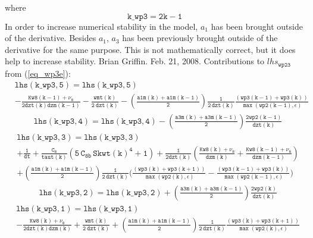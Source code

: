 \documentclass[11pt,fleqn]{article}
\begin{document}
%
where
%
\begin{equation}
\mathtt{ k\_wp3 = 2 k - 1}
\end{equation}
%
In order to increase numerical stability in the model, $a_{1}$ has been brought
outside of the derivative.  Besides $a_{1}$, $a_{3}$ has been previously brought
outside of the derivative for the same purpose.  This is not mathematically
correct, but it does help to increase stability.  Brian Griffin.  Feb. 21, 2008.
% 
Contributions to $lhs_{\mathtt{wp23}}$ from (\ref{eq_wp3e}):
%
\begin{equation}
\begin{split}
& \mathtt{ lhs(k\_wp3,5) = lhs(k\_wp3,5) }\\
& \mathtt{
- \frac{Kw8(k-1)+\nu_8}{2 dzt(k)dzm(k-1)}
- \frac{ wmt(k) }{ 2 \ dzt(k) }
- \left(\frac{a1m(k)+a1m(k-1)}{2}\right) \frac{1}{2 \, dzt(k)}
  \frac{ \left(wp3(k-1)+wp3(k)\right) }
       { \max\left( wp2(k-1), \epsilon \right) }
}
\end{split}
\end{equation}
%
\begin{equation}
\begin{split}
& \mathtt{ lhs(k\_wp3,4) = lhs(k\_wp3,4) 
  - \left(\frac{a3m(k)+a3m(k-1)}{2}\right) \frac{2 wp2(k-1)}{dzt(k)}
  }
\end{split}
\end{equation}
%
\begin{equation}
\begin{split}
& \mathtt{ lhs(k\_wp3,3) = lhs(k\_wp3,3) }\\
& \mathtt{
+ \frac{1}{dt}
+ \frac{C_8}{taut(k)}
   \left(  5 \, C_{8b} \, {Skwt(k)}^4 + 1 \right)
+ \frac{1}{2 dzt(k)} \left(  \frac{Kw8(k)+\nu_8}{dzm(k)}
                           + \frac{Kw8(k-1)+\nu_8}{dzm(k-1)} \right)
} \\
& \mathtt{
+ \left(\frac{a1m(k)+a1m(k-1)}{2}\right) \frac{1}{2 \, dzt(k)}
  \bigg(
    \frac{ \left(wp3(k)+wp3(k+1)\right) }
         { \max\left( wp2(k), \epsilon \right) }
  - \frac{ \left(wp3(k-1)+wp3(k)\right) }
         { \max\left( wp2(k-1), \epsilon \right) }
  \bigg)
}
\end{split}
\end{equation}
%
\begin{equation}
\begin{split}
& \mathtt{ lhs(k\_wp3,2) = lhs(k\_wp3,2)
  + \left(\frac{a3m(k)+a3m(k-1)}{2}\right) \frac{2 wp2(k)}{dzt(k)}
  }
\end{split}
\end{equation}
%
\begin{equation}
\begin{split}
& \mathtt{ lhs(k\_wp3,1) = lhs(k\_wp3,1) }\\
& \mathtt{
- \frac{Kw8(k)+\nu_8}{2 dzt(k)dzm(k)}
+ \frac{ wmt(k) }{ 2 \ dzt(k) }
+ \left(\frac{a1m(k)+a1m(k-1)}{2}\right) \frac{1}{2 \, dzt(k)}
  \frac{ \left(wp3(k)+wp3(k+1)\right) }
       { \max\left( wp2(k), \epsilon \right) }
}
\end{split}
\end{equation}
\end{document}
